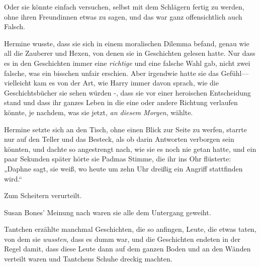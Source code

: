 Oder sie könnte einfach versuchen, selbst mit dem Schlägern fertig zu werden, ohne ihren Freundinnen etwas zu sagen, und das war ganz offensichtlich auch Falsch.

Hermine wusste, dass sie sich in einem moralischen Dilemma befand, genau wie all die Zauberer und Hexen, von denen sie in Geschichten gelesen hatte. Nur dass es in den Geschichten immer eine \emph{richtige} und eine falsche Wahl gab, nicht zwei falsche, was ein bisschen unfair erschien. Aber irgendwie hatte sie das Gefühl—vielleicht kam es von der Art, wie Harry immer davon sprach, wie die Geschichtsbücher sie sehen würden -, dass sie vor einer heroischen Entscheidung stand und dass ihr ganzes Leben in die eine oder andere Richtung verlaufen könnte, je nachdem, was sie jetzt, \emph{an diesem Morgen}, wählte.

Hermine setzte sich an den Tisch, ohne einen Blick zur Seite zu werfen, starrte nur auf den Teller und das Besteck, als ob darin Antworten verborgen sein könnten, und dachte so angestrengt nach, wie sie es noch nie getan hatte, und ein paar Sekunden später hörte sie Padmas Stimme, die ihr ins Ohr flüsterte: „Daphne sagt, sie weiß, wo heute um zehn Uhr dreißig ein Angriff stattfinden wird.“

\later

Zum Scheitern verurteilt.

Susan Bones' Meinung nach waren sie alle dem Untergang geweiht.

Tantchen erzählte manchmal Geschichten, die so anfingen, Leute, die etwas taten, von dem sie \emph{wussten}, dass es dumm war, und die Geschichten endeten in der Regel damit, dass diese Leute dann auf dem ganzen Boden und an den Wänden verteilt waren und Tantchens Schuhe dreckig machten.

